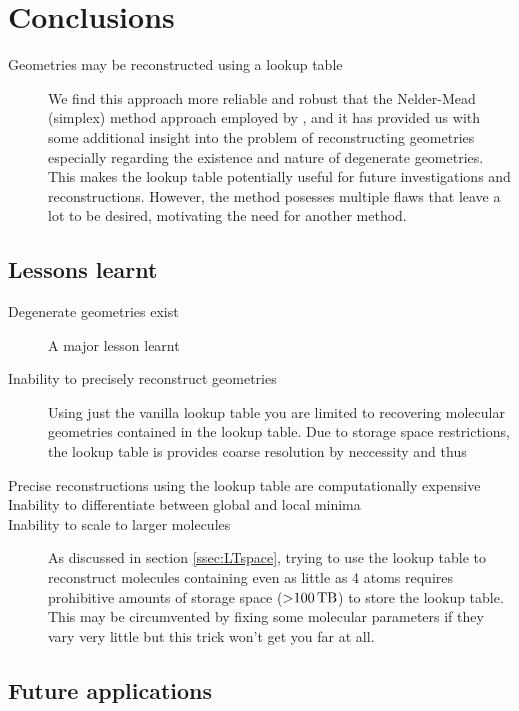 \section{Conclusions}
\begin{description}
  \item [Geometries may be reconstructed using a lookup table] We find this approach more reliable and robust that the Nelder-Mead (simplex) method approach employed by \citet{Brichta09}, and it has provided us with some additional insight into the problem of reconstructing geometries especially regarding the existence and nature of degenerate geometries. This makes the lookup table potentially useful for future investigations and reconstructions. However, the method posesses multiple flaws that leave a lot to be desired, motivating the need for another method.
\end{description}

\subsection{Lessons learnt}
\begin{description}
  \item [Degenerate geometries exist] A major lesson learnt
  \item [Inability to precisely reconstruct geometries] Using just the vanilla lookup table you are limited to recovering molecular geometries contained in the lookup table. Due to storage space restrictions, the lookup table is provides coarse resolution by neccessity and thus 
  \item [Precise reconstructions using the lookup table are computationally expensive]
  \item [Inability to differentiate between global and local minima]
  \item [Inability to scale to larger molecules] As discussed in section \ref{ssec:LTspace}, trying to use the lookup table to reconstruct molecules containing even as little as 4 atoms requires prohibitive amounts of storage space ($\SI{>100}{\tera\byte}$) to store the lookup table. This may be circumvented by fixing some molecular parameters if they vary very little but this trick won't get you far at all.
\end{description}

\subsection{Future applications}

